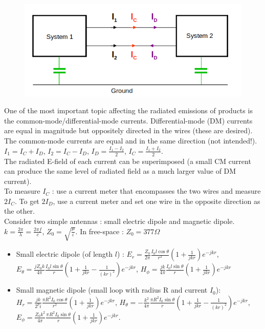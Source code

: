 \documentclass[../main.tex]{subfiles}
\begin{document}
\begin{figure}[hbt!]
    \centering
    \includegraphics[width=0.5\linewidth]{IMAGES/Electromag/Screenshot from 2025-02-20 19-22-36.png}
\end{figure}
One of the most important topic affecting the radiated emissions of products is the common-mode/differential-mode currents. Differential-mode (DM) currents are equal in magnitude but oppositely directed in the wires (these are desired). The common-mode currents are equal and in the same direction (not intended!). $I_1 = I_C+I_D$, $I_2 = I_C-I_D$, $I_D = \frac{I_1-I_2}{2}$, $I_C = \frac{I_1+I_2}{2}$. \\
The radiated E-field of each current can be superimposed (a small CM current can produce the same level of radiated field as a much larger value of DM current). \\
\warning To measure $I_C$ : use a current meter that encompasses the two wires and measure $2I_C$. To get $2I_D$, use a current meter and set one wire in the opposite direction as the other.\\


Consider two simple antennas : small electric dipole and magnetic dipole.\\
$k = \frac{2\pi}{\lambda} = \frac{2\pi f}{c}$, $Z_0 = \sqrt{\frac{\mu}{\varepsilon}}$. In free-space : $Z_0 = 377\Omega$\\
\begin{itemize}
    \item Small electric dipole (of length $l$) : $E_r = \frac{Z_0}{2\pi} \frac{I_0 l \cos \theta}{r^2} (1+\frac{1}{jkr}) e^{-jkr}$, $E_\theta = \frac{j Z_0k}{4\pi} \frac{I_0 l\sin \theta}{r} (1+\frac{1}{jkr} - \frac{1}{(kr)^2}) e^{-jkr}$, $H_\phi = \frac{jk}{4\pi} \frac{I_0 l \sin \theta}{r} (1+\frac{1}{jkr}) e^{-jkr}$
    \item Small magnetic dipole (small loop with radius R and current $I_0$): $H_r = \frac{jk}{2^pi} \frac{\pi R^2 I_0 \cos \theta}{r^2} (1+\frac{1}{jkr}) e^{-jkr}$, $H_\theta = -\frac{k^2}{4\pi} \frac{\pi R^2 I_0 \sin \theta}{r} (1+\frac{1}{jkr} - \frac{1}{(kr)^2}) e^{-jkr}$, $E_\phi = \frac{Z_0 k^2}{4\pi} \frac{\pi R^2 I_0 \sin \theta}{r} (1+\frac{1}{jkr}) e^{-jkr}$.
\end{itemize}
\end{document}
